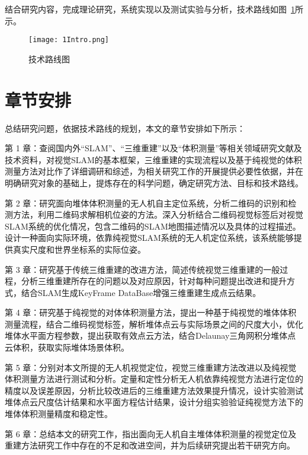 结合研究内容，完成理论研究，系统实现以及测试实验与分析，技术路线如图~\ref{fig:1Intro}所示。
\begin{figure}[H] %
  \centering
  \texttt{[image: 1Intro.png]}
  \caption{技术路线图}
  \label{fig:1Intro}
\end{figure}
\section{章节安排}
\label{sec:1.5}
总结研究问题，依据技术路线的规划，本文的章节安排如下所示：

第 1 章：查阅国内外“SLAM”、“三维重建”以及“体积测量”等相关领域研究文献及技术资料，对视觉SLAM的基本框架，三维重建的实现流程以及基于纯视觉的体积测量方法对比作了详细调研和综述，为相关研究工作的开展提供必要性依据，并在明确研究对象的基础上，提炼存在的科学问题，确定研究方法、目标和技术路线。

第 2 章：研究面向堆体体积测量的无人机自主定位系统，分析二维码的识别和检测方法，利用二维码求解相机位姿的方法。深入分析结合二维码视觉标签后对视觉SLAM系统的优化情况，包含二维码的SLAM地图描述情况以及具体的过程描述。设计一种面向实际环境，依靠纯视觉SLAM系统的无人机定位系统，该系统能够提供真实尺度和世界坐标系的实际位姿。

第 3 章：研究基于传统三维重建的改进方法，简述传统视觉三维重建的一般过程，分析三维重建所存在的问题以及对应原因，针对每种问题提出改进和提升方式，结合SLAM生成KeyFrame DataBase增强三维重建生成点云结果。

第 4 章：研究基于纯视觉的对体体积测量方法，提出一种基于纯视觉的堆体体积测量流程，结合二维码视觉标签，解析堆体点云与实际场景之间的尺度大小，优化堆体水平面方程参数，提出获取有效点云方法，结合Delaunay三角网积分堆体点云体积，获取实际堆体场景体积。

第 5 章：分别对本文所提的无人机视觉定位，视觉三维重建方法改进以及纯视觉体积测量方法进行测试和分析。定量和定性分析无人机依靠纯视觉方法进行定位的精度以及误差原因，分析比较改进后的三维重建方法效果提升情况，设计实验测试堆体点云尺度估计结果和水平面方程估计结果，设计分组实验验证纯视觉方法下的堆体体积测量精度和稳定性。

第 6 章：总结本文的研究工作，指出面向无人机自主堆体体积测量的视觉定位及重建方法研究工作中存在的不足和改进空间，并为后续研究提出若干研究方向。